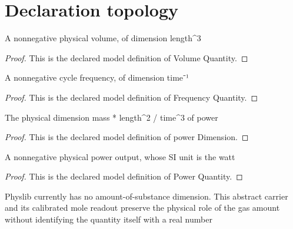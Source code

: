 \section{Declaration topology}
\begin{definition}
  \label{def:physics:phyx-mini-0355:phyxminiproblems-problemphyxmini0355-volumequantity}
  A nonnegative physical volume, of dimension length\textasciicircum{}3
\end{definition}
\begin{proof}
  This is the declared model definition of Volume Quantity.
\end{proof}
\begin{definition}
  \label{def:physics:phyx-mini-0355:phyxminiproblems-problemphyxmini0355-frequencyquantity}
  A nonnegative cycle frequency, of dimension time⁻¹
\end{definition}
\begin{proof}
  This is the declared model definition of Frequency Quantity.
\end{proof}
\begin{definition}
  \label{def:physics:phyx-mini-0355:phyxminiproblems-problemphyxmini0355-powerdimension}
  The physical dimension mass * length\textasciicircum{}2 / time\textasciicircum{}3 of power
\end{definition}
\begin{proof}
  This is the declared model definition of power Dimension.
\end{proof}
\begin{definition}
  \label{def:physics:phyx-mini-0355:phyxminiproblems-problemphyxmini0355-powerquantity}
  A nonnegative physical power output, whose SI unit is the watt
\end{definition}
\begin{proof}
  This is the declared model definition of Power Quantity.
\end{proof}
\begin{definition}
  \label{def:physics:phyx-mini-0355:phyxminiproblems-problemphyxmini0355-amountofsubstancescale}
  Physlib currently has no amount-of-substance dimension. This abstract carrier and its calibrated mole readout preserve the physical role of the gas amount without identifying the quantity itself with a real number
\end{definition}
